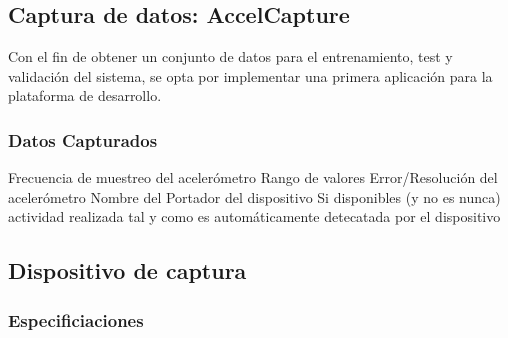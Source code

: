 \documentclass[../tfm.tex]{subfiles}
\begin{document}
\subsection{Captura de datos: AccelCapture}

Con el fin de obtener un conjunto de datos para el entrenamiento, test y validación del sistema, se opta por implementar una primera aplicación para la plataforma de desarrollo.

\subsubsection{}

\subsubsection{Datos Capturados}

Frecuencia de muestreo del acelerómetro
Rango de valores
Error/Resolución del acelerómetro
Nombre del Portador del dispositivo
Si disponibles (y no es nunca) actividad realizada tal y como es automáticamente detecatada por el dispositivo


\subsection{Dispositivo de captura}

\subsubsection{Especificiaciones}

\end{document}
